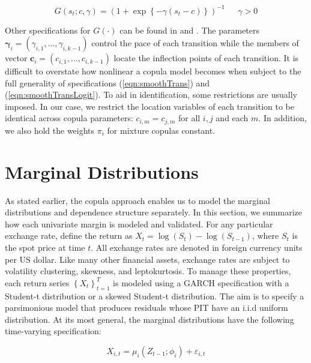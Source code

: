 \documentclass[12pt]{article}
\begin{document}
\begin{equation} \label{eqn:smoothTransLogit}
	G\left(s_{t}; c, \gamma\right) = \left(1+\exp\left\{ -\gamma \left(s_{t}-c\right) \right\}\right)^{-1}~~~~~~~\gamma > 0
\end{equation}

Other specifications for $G\left( \cdot \right) $ can be found in \cite{Dijk_and_Frances_1999} and \cite{Ocal_and_Osborn_2000}. The parameters $\boldsymbol{\gamma}_{i} = \left(\gamma_{i,1},...,\gamma_{i,k-1}\right)$ control the pace of each transition while the members of vector $\mathbf{c}_{i} = \left(c_{i,1},...,c_{i,k-1}\right)$ locate the inflection points of each transition. It is difficult to overstate how nonlinear a copula model becomes when subject to the full generality of specifications (\ref{eqn:smoothTrans}) and (\ref{eqn:smoothTransLogit}). To aid in identification, some restrictions are usually imposed. In our case, we restrict the location variables of each transition to be identical across copula parameters: $c_{i,m}=c_{j,m}$ for all $i,j$ and each $m$. In addition, we also hold the weights $\pi_{i}$ for mixture copulas constant.

\section{Marginal Distributions}

As stated earlier, the copula approach enables us to model the marginal distributions and dependence structure separately. In this section, we summarize how each univariate margin is modeled and validated. For any particular exchange rate, define the return as $X_{t} = \log \left(S_{t}\right) - \log\left(S_{t-1}\right)$, where $S_{t}$ is the spot price at time $t$. All exchange rates are denoted in foreign currency units per US dollar. Like many other financial assets, exchange rates are subject to volatility clustering, skewness, and leptokurtosis. To manage these properties, each return series $\left\{X_{t}\right\}_{t=1}^{T}$ is modeled using a GARCH specification with a Student-t distribution or a skewed Student-t distribution. The aim is to specify a parsimonious model that produces residuals whose PIT have an i.i.d uniform distribution. At its most general, the marginal distributions have the following time-varying specification:

\begin{equation} \label{eqn:marginalModel}
	X_{i,t} = \mu_{i}\left(Z_{t - 1}; \phi_{i}\right) + \varepsilon_{i,t}
\end{equation}
\end{document}
